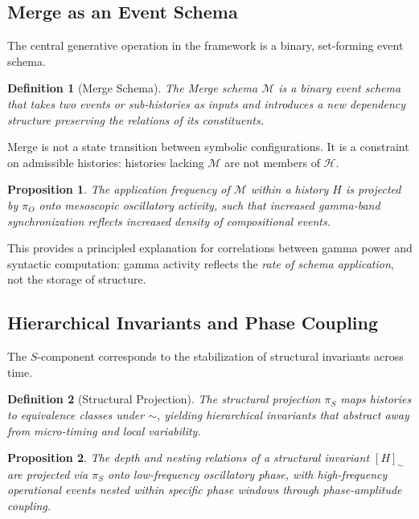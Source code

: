 \documentclass[11pt]{article}
\newtheorem{definition}{Definition}
\newtheorem{proposition}{Proposition}
\begin{document}
\subsection{Merge as an Event Schema}

The central generative operation in the framework is a binary, set-forming event schema.

\begin{definition}[Merge Schema]
The \emph{Merge schema} $\mathcal{M}$ is a binary event schema that takes two events or sub-histories as inputs and introduces a new dependency structure preserving the relations of its constituents.
\end{definition}

Merge is not a state transition between symbolic configurations. It is a constraint on admissible histories: histories lacking $\mathcal{M}$ are not members of $\mathcal{H}$.

\begin{proposition}
The application frequency of $\mathcal{M}$ within a history $H$ is projected by $\pi_O$ onto mesoscopic oscillatory activity, such that increased gamma-band synchronization reflects increased density of compositional events.
\end{proposition}

This provides a principled explanation for correlations between gamma power and syntactic computation: gamma activity reflects the \emph{rate of schema application}, not the storage of structure.

\subsection{Hierarchical Invariants and Phase Coupling}

The $S$-component corresponds to the stabilization of structural invariants across time.

\begin{definition}[Structural Projection]
The structural projection $\pi_S$ maps histories to equivalence classes under $\sim$, yielding hierarchical invariants that abstract away from micro-timing and local variability.
\end{definition}

\begin{proposition}
The depth and nesting relations of a structural invariant $[H]_{\sim}$ are projected via $\pi_S$ onto low-frequency oscillatory phase, with high-frequency operational events nested within specific phase windows through phase-amplitude coupling.
\end{proposition}
\end{document}

